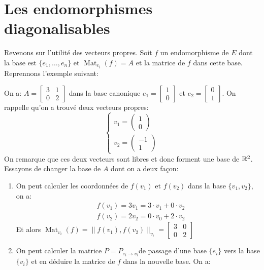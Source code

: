\section{Les endomorphismes diagonalisables}
Revenons sur l'utilité des vecteurs propres. Soit $f$ un endomorphisme de  $E$ dont la base est  $\{e_1, \ldots, e_n\}$ et $\operatorname{Mat}_{e_i}(f) = A$ et la matrice de  $f$ dans cette base. Reprennons l'exemple suivant:
 \begin{eg}
     On a: $A = \begin{bmatrix} 3 & 1\\ 0 & 2 \end{bmatrix} $ dans la base canonique $e_1 = \begin{bmatrix} 1 \\ 0 \end{bmatrix} $ et $e_2 = \begin{bmatrix} 0 \\ 1 \end{bmatrix} $. On rappelle qu'on a trouvé deux vecteurs propres:
     \[
     \begin{cases}
         v_1 = \begin{pmatrix} 1 \\ 0 \end{pmatrix} \\
         v_2 = \begin{pmatrix} -1 \\ 1 \end{pmatrix} 
     \end{cases}
     \] 
     On remarque que ces deux vecteurs sont libres et donc forment une base  de $\mathbb{R}^2$. Essayons de changer la base de $A$ dont on a deux façon:
      \begin{enumerate}
          \item On peut calculer les coordonnées de $f(v_1)$ et $f(v_2)$ dans la base $\{v_1, v_2\}$, on a:
              \begin{align*}
                  &f(v_1) = 3v_1 = 3 \cdot v_1 + 0 \cdot v_2\\
                  &f(v_2) = 2v_2 = 0 \cdot v_0 + 2 \cdot v_2
              \end{align*}
              Et alors $\operatorname{Mat}_{v_i}(f) = \|f(v_1), f(v_2)\|_{v_i} = \begin{bmatrix} 3 & 0 \\ 0 & 2 \end{bmatrix} $ 
          \item On peut calculer la matrice $P = P_{e_i \to v_i}$de passage d'une base $\{e_i\}$ vers la base  $\{v_i\}$ et en déduire la matrice de $f$ dans la nouvelle base. On a:

\end{enumerate}
\end{eg}
